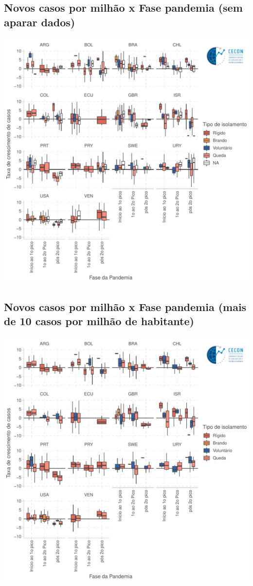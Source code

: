 \documentclass{SelfArx}
\begin{document}
\subsection*{Novos casos por milhão x Fase pandemia (sem aparar dados)}
\label{sec:org15d532c}
\begin{center}
\includegraphics[width=.9\linewidth]{./figs/COVID/Casos_Policy_Todos.pdf}
\end{center}


\subsection*{Novos casos por milhão x Fase pandemia (mais de 10 casos por milhão de habitante)}
\label{sec:orgee6c86a}

\begin{center}
\includegraphics[width=.9\linewidth]{./figs/COVID/Casos_Policy_10_Todos.pdf}
\end{center}
\end{document}
